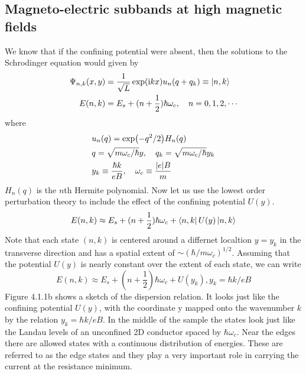 \documentclass[11pt,a4paper]{book}
\theoremstyle{plain}
\theoremstyle{definition}
\theoremstyle{remark}
\newcommand{\ii}{\mathrm{i}}                      %
\begin{document}
\subsection{Magneto-electric subbands at high magnetic fields}
We know that if the confining potential were absent, then the solutions to the Schrodinger equation would given by 
\begin{equation}
    \begin{aligned}
        \Psi_{n,k}(x,y) & = \frac{1}{\sqrt{L}} \exp(\ii k x) u_n(q+q_k)\equiv \ket{n,k} \\
        E(n,k) & = E_s + (n+\frac{1}{2})\hbar \omega_c, \quad n = 0,1,2,\cdots
    \end{aligned}
\end{equation}
where 
\begin{equation}
    \begin{aligned}
        & u_n(q) = \exp(-q^2/2) H_n(q)\\
        & q = \sqrt{m\omega_c/\hbar}y, \quad q_k = \sqrt{m\omega_c/\hbar} y_k \\
        & y_k \equiv \frac{\hbar k}{e B}, \quad \omega_c \equiv \frac{\abs{e} B}{m}
    \end{aligned}
\end{equation}
$H_n(q)$ is the $n$th Hermite polynomial. Now let us use the lowest order perturbation theory to include the effect of the confining potential $U(y)$. 
\begin{equation}
    E(n,k) \approx E_s + (n + \frac{1}{2})\hbar \omega_c + \bra{n,k} U(y) \ket{n,k}
\end{equation}
Note that each state $(n,k)$ is centered around a differnet localtion $y=y_k$ in the transverse direction and has a spatial extent of $\sim (\hbar/m\omega_c)^{1/2}$. Assuming that the potential $U(y)$ is nearly constant over the extent of each state, we can write
\begin{equation}
    E(n,k) \approx E_s + (n + \frac{1}{2})\hbar \omega_c + U(y_k), y_k = \hbar k / e B
\end{equation}
Figure 4.1.1b shows a sketch of the dispersion relation. It looks just like the confining potential $U(y)$, with the coordinate y mapped onto the wavenumber $k$ by the relation $y_k = \hbar k/e B$. In the middle of the sample the states look just like the Landau levels of an unconfined 2D conductor spaced by $\hbar \omega_c$. Near the edges there are allowed states with a continuous distribution of energies. These are referred to as the edge states and they play a very important role in carrying the current at the resistance minimum.\\
\end{document}
